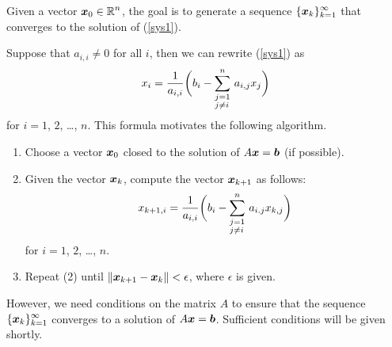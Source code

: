 Given a vector $\displaystyle \bm{x}_{0} \in \mathbb{R}^n$, the goal is to generate a
sequence $\displaystyle \{\bm{x}_{k}\}_{k=1}^\infty$ that converges to
the solution of (\ref{sys1}).

Suppose that $a_{i,i} \neq 0$ for all $i$, then we can rewrite
(\ref{sys1}) as
\[
x_i = \frac{1}{a_{i,i}}\bigg(b_i -
\sum_{\begin{subarray}{l}j=1\\ j \neq i\end{subarray}}^n \,a_{i,j}x_j \bigg)
\]
for $i=1$, $2$, \ldots, $n$.  This formula motivates the following
algorithm.

\begin{algo}
\begin{enumerate}
\item Choose a vector $\bm{x}_{0}$ closed to the solution of
$ A \bm{x} = \bm{b}$ (if possible).
\item Given the vector $\bm{x}_{k}$, compute the vector
$\bm{x}_{k+1}$ as follows:
\begin{equation} \label{formula5}
x_{k+1,i} = \frac{1}{a_{i,i}} \bigg( b_i
-\sum_{\begin{subarray}{l}j=1\\ j \neq i\end{subarray}}^n\, a_{i.j}
x_{k,j} \bigg)
\end{equation}
for $i = 1$, $2$, \ldots, $n$.
\item Repeat (2) until $\| \bm{x}_{k+1} - \bm{x}_{k} \| < \epsilon$,
where $\epsilon$ is given.
\end{enumerate}
\end{algo}

However, we need conditions on the matrix $A$ to ensure that the
sequence $\displaystyle \{\bm{x}_k\}_{k=1}^\infty$ converges to a
solution of $A\bm{x} = \bm{b}$.  Sufficient conditions will be given
shortly.

